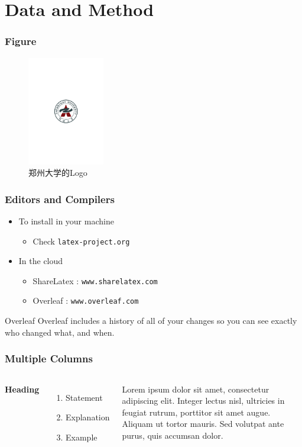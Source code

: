 \documentclass[aspectratio=169]{beamer}
\begin{document}
\section{Data and Method}

\begin{frame}
\frametitle{Figure}
\vspace{-0.3cm}
\begin{figure}[h]
\centering
\includegraphics[width=0.3\textwidth]{images/ZZU_badge.pdf}
\caption{郑州大学的Logo}
\end{figure}
\end{frame}


\begin{frame}
\frametitle{Editors and Compilers}
\begin{itemize}
\item To install in your machine
\begin{itemize}
\item Check \texttt{latex-project.org}
\end{itemize}
\item In the cloud
\begin{itemize}
\item ShareLatex : \texttt{www.sharelatex.com}
\item Overleaf : \texttt{www.overleaf.com}
\end{itemize}
\end{itemize}
\vskip 1cm
\begin{block}{Overleaf}
    Overleaf includes a history of all of your changes so you can see exactly who changed what, and when. 
\end{block}
\end{frame}


\begin{frame}
\frametitle{Multiple Columns}
\begin{columns}[c]
\textbf{Heading}
\begin{enumerate}
\item Statement
\item Explanation
\item Example
\end{enumerate}
Lorem ipsum dolor sit amet, consectetur adipiscing elit. Integer lectus nisl, ultricies in feugiat rutrum, porttitor sit amet augue. Aliquam ut tortor mauris. Sed volutpat ante purus, quis accumsan dolor.
\end{columns}
\end{frame}
\end{document}

